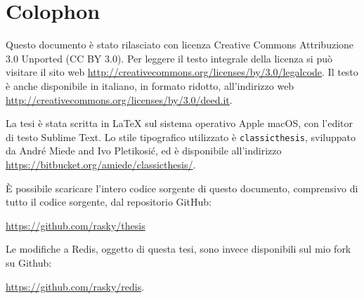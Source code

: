 \pagestyle{empty}

\hfill

\vfill


\section*{Colophon}

Questo documento è stato rilasciato con licenza Creative Commons Attribuzione
3.0 Unported (CC BY 3.0). Per leggere il testo integrale della licenza si può
visitare il sito web \url{http://creativecommons.org/licenses/by/3.0/legalcode}. 
Il testo è anche disponibile in italiano, in formato ridotto, all'indirizzo web
\url{http://creativecommons.org/licenses/by/3.0/deed.it}.

La tesi è stata scritta in \LaTeX{} sul sistema operativo Apple macOS, con
l'editor di testo Sublime Text. Lo stile tipografico utilizzato è \texttt{classicthesis},
sviluppato da Andr\'e Miede and Ivo Pletikosić, ed è disponibile all'indirizzo
\url{https://bitbucket.org/amiede/classicthesis/}.

È possibile scaricare l'intero codice sorgente di questo documento, comprensivo 
di tutto il codice sorgente, dal repositorio GitHub:
\begin{center}
\url{https://github.com/rasky/thesis}
\end{center}

Le modifiche a Redis, oggetto di questa tesi, sono invece dis\-po\-ni\-bi\-li sul mio 
fork su Github:
\begin{center}
\url{https://github.com/rasky/redis}.
\end{center}

\bigskip

\noindent\finalVersionString


